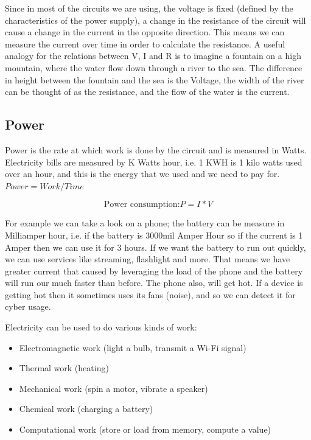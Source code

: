 Since in most of the circuits we are using, the voltage is fixed (defined by the characteristics of the power supply), a change in the resistance of the circuit will cause a change in the current in the opposite direction. This means we can measure the current over time in order to calculate the resistance. A useful analogy for the relations between V, I and R is to imagine a fountain on a high mountain, where the water flow down through a river to the sea. The difference in height between the fountain and the sea is the Voltage, the width of the river can be thought of as the resistance, and the flow of the water is the current.

\subsection{Power}

Power is the rate at which work is done by the circuit and is measured in Watts. Electricity bills are measured by K Watts hour, i.e. 1 KWH is 1 kilo watts used over an hour, and this is the energy that we used and we need to pay for. $Power = Work / Time$

\begin{displaymath}\label{eq:power_consumption}
    \textrm{Power consumption:} P=I*V
\end{displaymath}

For example we can take a look on a phone; the battery can be measure in Milliamper hour, i.e. if the battery is 3000mil Amper Hour so if the current is 1 Amper then we can use it for 3 hours. If we want the battery to run out quickly, we can use services like streaming, flashlight and more. That means we have greater current that caused by leveraging the load of the phone and the battery will run our much faster than before. The phone also, will get hot. If a device is getting hot then it sometimes uses its fans (noise), and so we can detect it for cyber usage.

Electricity can be used to do various kinds of work:
\begin{itemize}
    \item Electromagnetic work (light a bulb, transmit a Wi-Fi signal)
    \item Thermal work (heating)
    \item Mechanical work (spin a motor, vibrate a speaker)
    \item Chemical work (charging a battery)
    \item Computational work (store or load from memory, compute a value)
\end{itemize}

